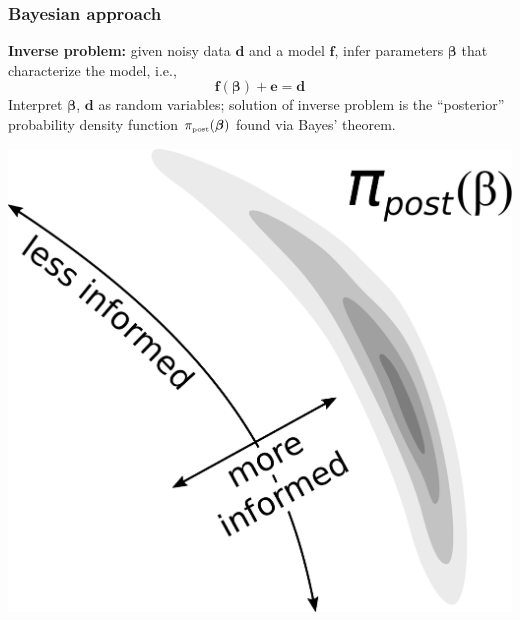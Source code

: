 \documentclass[10pt,final,xcolor=dvipsnames]{beamer}
\newcommand{\bs}[1]{\ensuremath{\boldsymbol{#1}}}
\begin{document}
\begin{frame}
  \frametitle{Bayesian approach} \textbf{Inverse problem:}
  given noisy data $\bs d$ and a model
  $\bs f$, infer parameters $\bs \beta$ that characterize the model, i.e.,
  \begin{equation*}
    \bs f(\bs \beta) + \bs e = \bs d
  \end{equation*}
  Interpret $\bs \beta$, $\bs d$ as random variables;
  solution of inverse problem is the ``posterior'' probability density function
  $\pi_{\mbox{\tiny post}}(\bs \beta)$ found via Bayes' theorem.\\
  \vspace{1em}
  \begin{center}
  	\includegraphics[scale=0.23]{informed_uninformed_modes.pdf}
  \end{center}
\end{frame}

%	
%	
\end{document}
